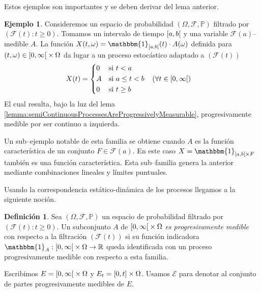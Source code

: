 \documentclass{report}
\newcommand{\leftOpenInterval}{\left]}
\newcommand{\rightOpenInterval}{\right[}
\newcommand{\leftClosedInterval}{\left[}
\newcommand{\rightClosedInterval}{\right]}
\newcommand{\interval}[3]{%
    \ifstrequal{#1}{oo}{%
      \leftOpenInterval #2, #3 \rightOpenInterval%
    }{%
      \ifstrequal{#1}{co}{%
        \leftClosedInterval #2, #3 \rightOpenInterval%
      }{%
        \ifstrequal{#1}{oc}{
          \leftOpenInterval #2, #3 \rightClosedInterval%
        }{%
          \ifstrequal{#1}{cc}{
            \leftClosedInterval #2, #3 \rightClosedInterval
          }{%
          }%
        }%
      }%
    }%
  }
\newcommand{\characteristic}{\mathbbm{1}}
\newcommand{\prob}{\mathbb{P}}
\newcommand{\events}{\mathcal{F}}
\newcommand{\borel}{\mathscr{B}}
\newcommand{\progressiveAlgebra}{\mathscr{E}}
\newcommand{\realNumbers}{\mathbb{R}}
\theoremstyle{plain}
\theoremstyle{remark}
\theoremstyle{definition}
\newtheorem{definition}{Definición}
\newtheorem{example}{Ejemplo}
\begin{document}
Estos ejemplos son importantes y se deben derivar del lema anterior.
\begin{example}
  Consideremos un espacio de probabilidad \((\Omega, \events, \prob)\) filtrado por \((\events(t) : t \geq 0)\).
  Tomamos un intervalo de tiempo \(\interval{co}{a}{b}\) y una variable \(\events(a)\)--medible \(A\).
  La función 
  \(X(t, \omega) = \characteristic_{\interval{co}{a}{b}}(t) \cdot A(\omega)\) definida para \((t, \omega) \in \interval{co}{0}{\infty} \times \Omega\)
  da lugar a un proceso estocástico adaptado a \((\events(t))\)
  \begin{align}
    &X(t)
    =
    \left\{\begin{aligned}
      & 0
        && \text{si } t < a
      \\
      & A
      && \text{si } a \leq t < b
      \\
      & 0
        && \text{si } t \geq b
    \end{aligned}\right.
    && (\forall t \in \interval{co}{0}{\infty})
  \end{align}
  El cual resulta, bajo la luz del lema \ref{lemma:semiContinuousProcessesAreProgressivelyMeasurable}, progresivamente medible por ser continuo a izquierda.

  Un sub--ejemplo notable de esta familia se obtiene cuando \(A\) es la función característica de un conjunto \(F \in \events(a)\).
  En este caso \(X = \characteristic_{\interval{co}{a}{b} \times F}\) también es una función característica.
  Esta sub--familia genera la anterior mediante combinaciones lineales y límites puntuales.
\end{example}


Usando la correspondencia estático-dinámica de los procesos llegamos a la siguiente noción. 
\begin{definition}
  Sea \((\Omega, \events, \prob)\) un espacio de probabilidad filtrado por \((\events(t) : t \geq 0)\).
  Un subconjunto \(A\) de \(\interval{co}{0}{\infty} \times \Omega\) \emph{es progresivamente medible} con respecto a la filtración \((\events(t))\) si su función indicadora \(\characteristic_A : \interval{co}{0}{\infty} \times \Omega \rightarrow \realNumbers\) queda identificada con un proceso progresivamente medible con respecto a esta familia.

  Escribimos \(E = \interval{co}{0}{\infty} \times \Omega\) y \(E_t = \interval{cc}{0}{t} \times \Omega\). Usamos \(\progressiveAlgebra\) para denotar al conjunto de partes progresivamente medibles de \(E\).
\end{definition}
\end{document}
